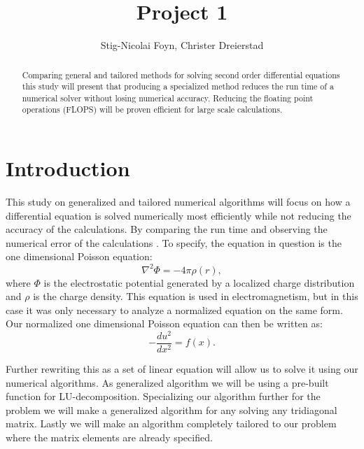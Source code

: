 \documentclass{emulateapj}
\begin{document}
\title{Project 1}

\author{Stig-Nicolai Foyn, Christer Dreierstad}





\begin{abstract}
Comparing general and tailored methods for solving second order differential equations this study will present that producing a specialized method reduces the run time of a numerical solver without losing numerical accuracy. Reducing the floating point operations (FLOPS) will be proven efficient for large scale calculations.

\end{abstract}

\section{Introduction}
\label{sec:introduction}
This study on generalized and tailored numerical algorithms will focus on how a differential equation is solved numerically most efficiently while not reducing the accuracy of the calculations. By comparing the run time and observing the numerical error of the calculations . To specify, the equation in question is the one dimensional Poisson equation:
%
\begin{equation*}
    {\nabla^{2}} \Phi = -4\pi \rho(r),
\end{equation*}
%
where $\Phi$ is the electrostatic potential generated by a localized charge distribution and $\rho$ is the charge density. This equation is used in electromagnetism, but in this case it was only necessary to analyze a normalized equation on the same form. Our normalized one dimensional Poisson equation can then be written as:
%
\begin{equation}\label{eq:-u''}
    -\frac{du^2}{dx^2} = f(x).
\end{equation}

Further rewriting this as a set of linear equation will allow us to solve it using our numerical algorithms. As generalized algorithm we will be using a pre-built function for LU-decomposition. Specializing our algorithm further for the problem we will make a generalized algorithm for any solving any tridiagonal matrix. Lastly we will make an algorithm completely tailored to our problem where the matrix elements are already specified. 
\end{document}
